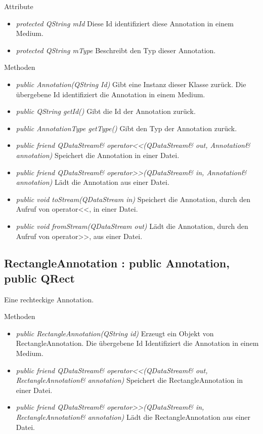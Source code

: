 Attribute
\begin{itemize}
\item\textit{protected QString mId} Diese Id identifiziert diese Annotation in einem  Medium.
\item\textit{protected QString mType} Beschreibt den Typ dieser Annotation.
\end{itemize}

Methoden
\begin{itemize}
\item \textit{public Annotation(QString Id)} Gibt eine Instanz dieser Klasse zurück. Die übergebene Id identifiziert die Annotation in einem Medium.
\item \textit{public QString getId()} Gibt die Id der Annotation zurück.
\item \textit{public AnnotationType getType()} Gibt den Typ der Annotation zurück.
\item \textit{public friend QDataStream\& operator<<(QDataStream\& out, Annotation\& annotation)} Speichert die Annotation in einer Datei.
\item \textit{public friend QDataStream\& operator>>(QDataStream\& in, Annotation\& annotation)} Lädt die Annotation aus einer Datei.
\item \textit{public void toStream(QDataStream in)} Speichert die Annotation, durch den Aufruf von operator<<, in einer Datei.
\item \textit{public void fromStream(QDataStream out)} Lädt die Annotation, durch den Aufruf von operator>>, aus einer Datei.
\end{itemize}

\subsection*{RectangleAnnotation : public Annotation, public QRect}
Eine rechteckige Annotation.

Methoden
\begin{itemize}
\item \textit{public RectangleAnnotation(QString id)} Erzeugt ein Objekt von RectangleAnnotation. Die übergebene Id Identifiziert die Annotation in einem Medium.
\item \textit{public friend QDataStream\& operator<<(QDataStream\& out, RectangleAnnotation\& annotation)} Speichert die RectangleAnnotation in einer Datei.
\item \textit{public friend QDataStream\& operator>>(QDataStream\& in, RectangleAnnotation\& annotation)} Lädt die RectangleAnnotation aus einer Datei.
\end{itemize}

